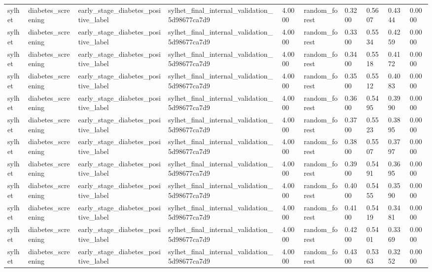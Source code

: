 \begin{tabular}{llllllllll}
sylhet & diabetes\_screening & early\_stage\_diabetes\_positive\_label & sylhet\_final\_internal\_validation\_5d98677ca7d9 & 4.0000 & random\_forest & 0.3200 & 0.5607 & 0.4344 & 0.0000 \\
sylhet & diabetes\_screening & early\_stage\_diabetes\_positive\_label & sylhet\_final\_internal\_validation\_5d98677ca7d9 & 4.0000 & random\_forest & 0.3300 & 0.5534 & 0.4259 & 0.0000 \\
sylhet & diabetes\_screening & early\_stage\_diabetes\_positive\_label & sylhet\_final\_internal\_validation\_5d98677ca7d9 & 4.0000 & random\_forest & 0.3400 & 0.5518 & 0.4172 & 0.0000 \\
sylhet & diabetes\_screening & early\_stage\_diabetes\_positive\_label & sylhet\_final\_internal\_validation\_5d98677ca7d9 & 4.0000 & random\_forest & 0.3500 & 0.5512 & 0.4083 & 0.0000 \\
sylhet & diabetes\_screening & early\_stage\_diabetes\_positive\_label & sylhet\_final\_internal\_validation\_5d98677ca7d9 & 4.0000 & random\_forest & 0.3600 & 0.5495 & 0.3990 & 0.0000 \\
sylhet & diabetes\_screening & early\_stage\_diabetes\_positive\_label & sylhet\_final\_internal\_validation\_5d98677ca7d9 & 4.0000 & random\_forest & 0.3700 & 0.5523 & 0.3895 & 0.0000 \\
sylhet & diabetes\_screening & early\_stage\_diabetes\_positive\_label & sylhet\_final\_internal\_validation\_5d98677ca7d9 & 4.0000 & random\_forest & 0.3800 & 0.5507 & 0.3797 & 0.0000 \\
sylhet & diabetes\_screening & early\_stage\_diabetes\_positive\_label & sylhet\_final\_internal\_validation\_5d98677ca7d9 & 4.0000 & random\_forest & 0.3900 & 0.5491 & 0.3695 & 0.0000 \\
sylhet & diabetes\_screening & early\_stage\_diabetes\_positive\_label & sylhet\_final\_internal\_validation\_5d98677ca7d9 & 4.0000 & random\_forest & 0.4000 & 0.5455 & 0.3590 & 0.0000 \\
sylhet & diabetes\_screening & early\_stage\_diabetes\_positive\_label & sylhet\_final\_internal\_validation\_5d98677ca7d9 & 4.0000 & random\_forest & 0.4100 & 0.5419 & 0.3481 & 0.0000 \\
sylhet & diabetes\_screening & early\_stage\_diabetes\_positive\_label & sylhet\_final\_internal\_validation\_5d98677ca7d9 & 4.0000 & random\_forest & 0.4200 & 0.5401 & 0.3369 & 0.0000 \\
sylhet & diabetes\_screening & early\_stage\_diabetes\_positive\_label & sylhet\_final\_internal\_validation\_5d98677ca7d9 & 4.0000 & random\_forest & 0.4300 & 0.5363 & 0.3252 & 0.0000 \\

\end{tabular}
